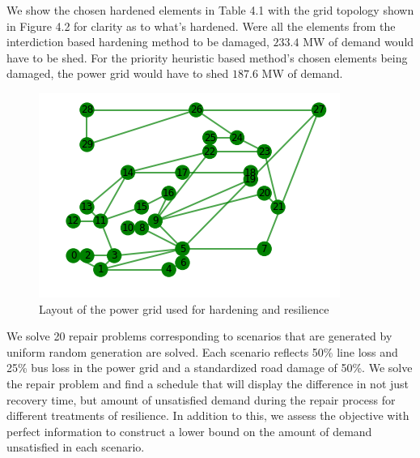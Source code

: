 We show the chosen hardened elements in Table 4.1 with the grid topology shown in Figure 4.2 for clarity as to what's hardened. Were all the elements from the interdiction based hardening method to be damaged, $233.4$ MW of demand would have to be shed. For the priority heuristic based method's chosen elements being damaged, the power grid would have to shed $187.6$ MW of demand.
\begin{figure}[htbp]
	\centering
	\includegraphics[width=.75\linewidth]{IEEE30layout.png}
	\caption{Layout of the power grid used for hardening and resilience}
\end{figure}

\begin{table}[htbp]
	\centering
	\caption{Hardened elements by resilience method }
	
	\label{time}
\end{table}

 We solve 20 repair problems corresponding to scenarios that are generated by uniform random generation are solved. Each scenario reflects 50\% line loss and 25\% bus loss in the power grid and a standardized road damage of 50\%. We solve the repair problem and find a schedule that will display the difference in not just recovery time, but amount of unsatisfied demand during the repair process for different treatments of resilience. In addition to this, we assess the objective with perfect information to construct a lower bound on the amount of demand unsatisfied in each scenario.

